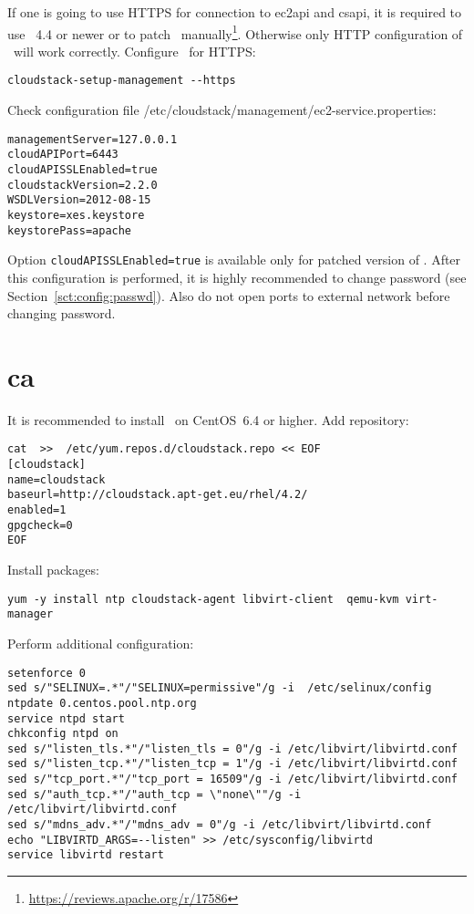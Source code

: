 If one is going to use HTTPS for connection to \acrshort{ec2api} and \acrshort{csapi}, it is required to use \cstack\ 4.4 or newer or to patch \cstack\ manually\footnote{\url{https://reviews.apache.org/r/17586}}.
Otherwise only HTTP configuration of \cstack\ will work correctly.
Configure \cstack\ for HTTPS:
\begin{lstlisting}
cloudstack-setup-management --https
\end{lstlisting}
Check configuration file /etc/cloudstack/management/ec2-service.properties:
\begin{lstlisting}
managementServer=127.0.0.1
cloudAPIPort=6443
cloudAPISSLEnabled=true
cloudstackVersion=2.2.0
WSDLVersion=2012-08-15
keystore=xes.keystore
keystorePass=apache
\end{lstlisting}
Option \texttt{cloudAPISSLEnabled=true} is available only for patched version of \cstack.
After this configuration is performed, it is highly recommended to change password (see Section~\ref{sct:config:passwd}). 
Also do not open ports to external network before changing password.


\section{\acrlong{ca}}
\label{sct:cloudstack:ca}

It is recommended to install \cstack\ on CentOS~6.4 or higher.
Add repository:
\begin{lstlisting}
cat  >>  /etc/yum.repos.d/cloudstack.repo << EOF
[cloudstack]
name=cloudstack
baseurl=http://cloudstack.apt-get.eu/rhel/4.2/
enabled=1
gpgcheck=0
EOF
\end{lstlisting}
Install packages:
\begin{lstlisting}
yum -y install ntp cloudstack-agent libvirt-client  qemu-kvm virt-manager
\end{lstlisting}
Perform additional configuration:
\begin{lstlisting}
setenforce 0
sed s/"SELINUX=.*"/"SELINUX=permissive"/g -i  /etc/selinux/config
ntpdate 0.centos.pool.ntp.org
service ntpd start
chkconfig ntpd on
sed s/"listen_tls.*"/"listen_tls = 0"/g -i /etc/libvirt/libvirtd.conf
sed s/"listen_tcp.*"/"listen_tcp = 1"/g -i /etc/libvirt/libvirtd.conf
sed s/"tcp_port.*"/"tcp_port = 16509"/g -i /etc/libvirt/libvirtd.conf
sed s/"auth_tcp.*"/"auth_tcp = \"none\""/g -i /etc/libvirt/libvirtd.conf
sed s/"mdns_adv.*"/"mdns_adv = 0"/g -i /etc/libvirt/libvirtd.conf
echo "LIBVIRTD_ARGS=--listen" >> /etc/sysconfig/libvirtd
service libvirtd restart
\end{lstlisting}


